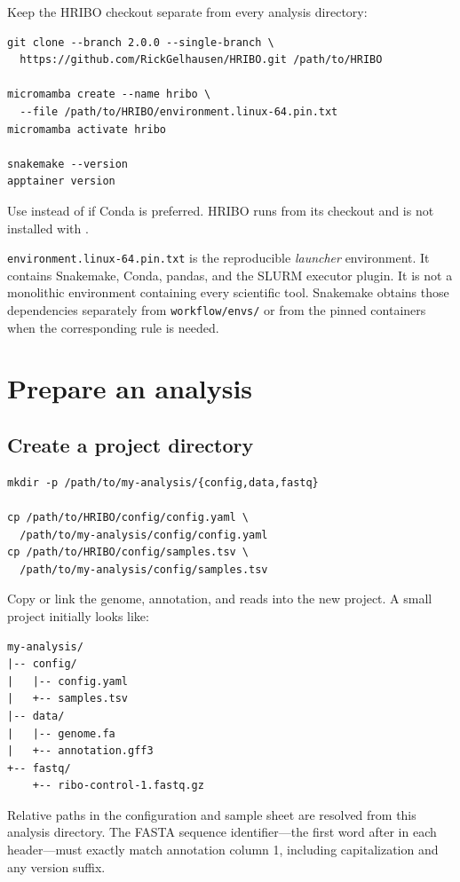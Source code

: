 \documentclass[11pt,a4paper]{article}
\newcommand{\setting}[1]{\texttt{\detokenize{#1}}}
\newcommand{\file}[1]{\nolinkurl{#1}}
\begin{document}
Keep the HRIBO checkout separate from every analysis directory:

\begin{lstlisting}[style=hribo]
git clone --branch 2.0.0 --single-branch \
  https://github.com/RickGelhausen/HRIBO.git /path/to/HRIBO

micromamba create --name hribo \
  --file /path/to/HRIBO/environment.linux-64.pin.txt
micromamba activate hribo

snakemake --version
apptainer version
\end{lstlisting}

Use \setting{conda create} instead of \setting{micromamba create} if Conda is
preferred. HRIBO runs from its checkout and is not installed with
\setting{pip}.

\file{environment.linux-64.pin.txt} is the reproducible \emph{launcher}
environment. It contains Snakemake, Conda, pandas, and the SLURM executor
plugin. It is not a monolithic environment containing every scientific tool.
Snakemake obtains those dependencies separately from \file{workflow/envs/} or
from the pinned containers when the corresponding rule is needed.

\section{Prepare an analysis}

\subsection{Create a project directory}

\begin{lstlisting}[style=hribo]
mkdir -p /path/to/my-analysis/{config,data,fastq}

cp /path/to/HRIBO/config/config.yaml \
  /path/to/my-analysis/config/config.yaml
cp /path/to/HRIBO/config/samples.tsv \
  /path/to/my-analysis/config/samples.tsv
\end{lstlisting}

Copy or link the genome, annotation, and reads into the new project. A small
project initially looks like:

\begin{lstlisting}[style=hribo]
my-analysis/
|-- config/
|   |-- config.yaml
|   +-- samples.tsv
|-- data/
|   |-- genome.fa
|   +-- annotation.gff3
+-- fastq/
    +-- ribo-control-1.fastq.gz
\end{lstlisting}

Relative paths in the configuration and sample sheet are resolved from this
analysis directory. The FASTA sequence identifier---the first word after
\setting{>} in each header---must exactly match annotation column 1, including
capitalization and any version suffix.
\end{document}
